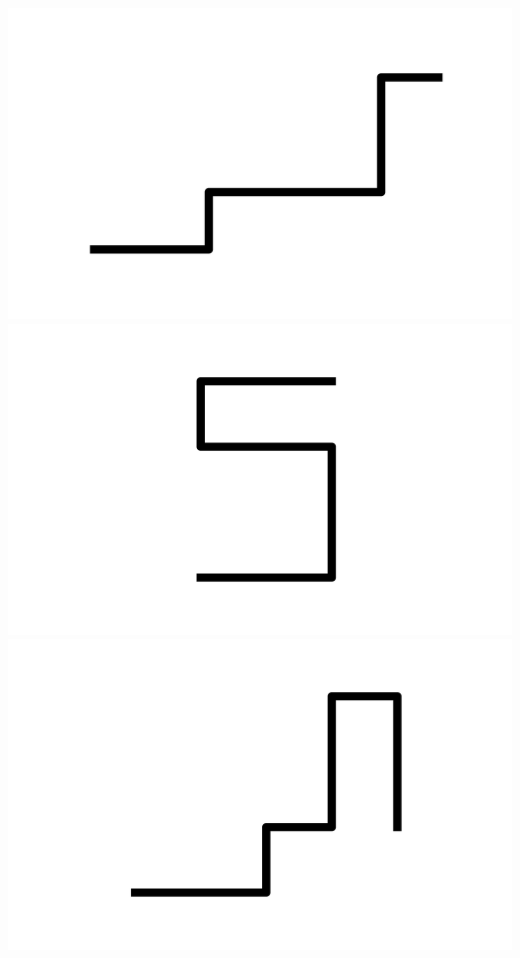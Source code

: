 \documentclass[]{report}
\begin{document}
\includegraphics[scale=.1]{pictures/21/state_cluster_shapes_382.pdf} 
\includegraphics[scale=.1]{pictures/21/state_cluster_shapes_383.pdf} 
\includegraphics[scale=.1]{pictures/21/state_cluster_shapes_384.pdf} 
\end{document}
